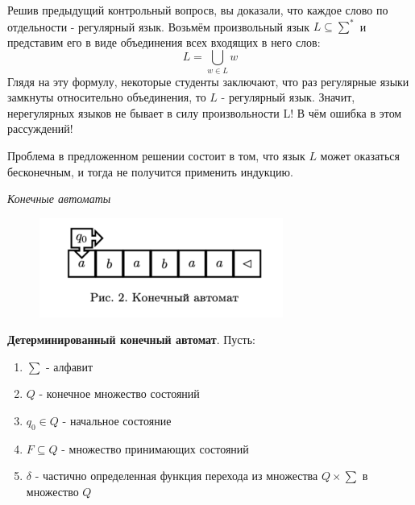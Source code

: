 \begin{question} Решив предыдущий контрольный вопросв, вы доказали, что каждое слово по отдельности - регулярный язык. Возьмём произвольный язык $L \subseteq \sum^{*}$ и представим его в виде объединения всех входящих в него слов:
    \begin{equation}
        L = \bigcup_{w \in L}{w}
    \end{equation}
    Глядя на эту формулу, некоторые студенты заключают, что раз регулярные языки замкнуты относительно объединения, то $L$ - регулярный язык. Значит, нерегулярных языков не бывает в силу произвольности L! В чём ошибка в этом рассуждений!
\end{question}
\begin{nonum}
    Проблема в предложенном решении состоит в том, что язык $L$ может оказаться бесконечным, и тогда не получится применить индукцию.
\end{nonum}

\begin{center}
    \textit{Конечные автоматы}
\end{center}

\begin{figure}[htp]
    \centering
    \includegraphics[width=8cm]{images/FiniteAutoma.PNG}
    \label{fig:stateMachine}
\end{figure}

\begin{Def}
    \textbf{Детерминированный конечный автомат}. Пусть:
    \begin{enumerate}
        \item $\sum$ - алфавит
        \item $Q$ - конечное множество состояний
        \item $q_0 \in Q$ - начальное состояние
        \item $F \subseteq Q$ - множество принимающих состояний
        \item $\delta$ - частично определенная функция перехода
              из множества $Q \times \sum$ в множество $Q$
    \end{enumerate}
\end{Def}